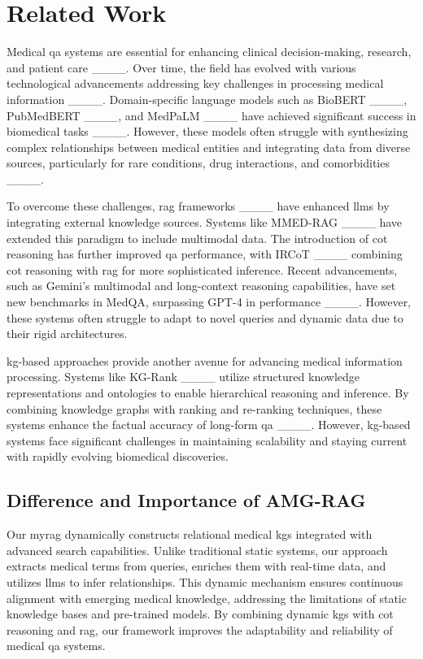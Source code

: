 \section{Related Work}
Medical \gls{qa} systems are essential for enhancing clinical decision-making, research, and patient care ____. Over time, the field has evolved with various technological advancements addressing key challenges in processing medical information ____. Domain-specific language models such as BioBERT ____, PubMedBERT ____, and MedPaLM ____ have achieved significant success in biomedical tasks ____. However, these models often struggle with synthesizing complex relationships between medical entities and integrating data from diverse sources, particularly for rare conditions, drug interactions, and comorbidities ____.

To overcome these challenges, \gls{rag} frameworks ____ have enhanced \glspl{llm} by integrating external knowledge sources. Systems like MMED-RAG ____ have extended this paradigm to include multimodal data. The introduction of \gls{cot} reasoning has further improved \gls{qa} performance, with IRCoT ____ combining \gls{cot} reasoning with \gls{rag} for more sophisticated inference. Recent advancements, such as Gemini's multimodal and long-context reasoning capabilities, have set new benchmarks in MedQA, surpassing GPT-4 in performance ____. However, these systems often struggle to adapt to novel queries and dynamic data due to their rigid architectures.

\gls{kg}-based approaches provide another avenue for advancing medical information processing. Systems like KG-Rank ____ utilize structured knowledge representations and ontologies to enable hierarchical reasoning and inference. By combining knowledge graphs with ranking and re-ranking techniques, these systems enhance the factual accuracy of long-form \gls{qa} ____. However, \gls{kg}-based systems face significant challenges in maintaining scalability and staying current with rapidly evolving biomedical discoveries.

\subsection*{Difference and Importance of AMG-RAG}

Our \gls{myrag} dynamically constructs relational medical \glspl{kg} integrated with advanced search capabilities. Unlike traditional static systems, our approach extracts medical terms from queries, enriches them with real-time data, and utilizes \glspl{llm} to infer relationships. This dynamic mechanism ensures continuous alignment with emerging medical knowledge, addressing the limitations of static knowledge bases and pre-trained models. By combining dynamic \glspl{kg} with \gls{cot} reasoning and \gls{rag}, our framework improves the adaptability and reliability of medical \gls{qa} systems.